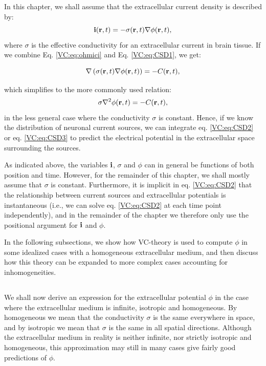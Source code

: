 In this chapter, we shall assume that the extracellular current density is described by:
\begin{equation}
{\bf i}({\bf r}, t) = - \sigma({\bf r}, t) \nabla \phi({\bf r}, t),
\label{VC:eq:ohmici}
\end{equation}
where $\sigma$ is the effective conductivity for an extracellular current in brain tissue. If we combine Eq. \ref{VC:eq:ohmici} and Eq. \ref{VC:eq:CSD1}, we get:

\begin{equation}
\nabla \left( \sigma({\bf r}, t) \nabla \phi({\bf r}, t) \right) = - C({\bf r}, t),
\label{VC:eq:CSD2}
\end{equation}

which simplifies to the more commonly used relation:
\begin{equation}
\sigma \nabla^2\phi({\bf r}, t) = - C({\bf r}, t),
\label{VC:eq:CSD3}
\end{equation}
in the less general case where the conductivity $\sigma$ is constant. Hence, if we know the distribution of neuronal current sources, we can integrate eq. \ref{VC:eq:CSD2} or eq. \ref{VC:eq:CSD3} to predict the electrical potential in the extracellular space surrounding the sources. 

As indicated above, the variables ${\bf i}$, $\sigma$ and $\phi$ can in general be functions of both position and time. However, for the remainder of this chapter, we shall mostly assume that $\sigma$ is constant. Furthermore, it is implicit in eq. \ref{VC:eq:CSD2} that the relationship between current sources and extracellular potentials is instantaneous (i.e., we can solve eq.  \ref{VC:eq:CSD2} at each time point independently), and in the remainder of the chapter we therefore only use the positional argument for ${\bf i}$ and $\phi$. 

In the following subsections, we show how VC-theory is used to compute $\phi$ in some idealized cases with a homogeneous extracellular medium, and then discuss how this theory can be expanded to more complex cases accounting for inhomogeneities. 


\subsection{}
\label{sec:isohomo}
We shall now derive an expression for the extracellular potential $\phi$ in the case where the extracellular medium is infinite, isotropic and homogeneous. By homogeneous we mean that the conductivity $\sigma$ is the same everywhere in space, and by isotropic we mean that $\sigma$ is the same in all spatial directions. Although the extracellular medium in reality is neither infinite, nor strictly isotropic and homogeneous, this approximation may still in many cases give fairly good predictions of $\phi$.



